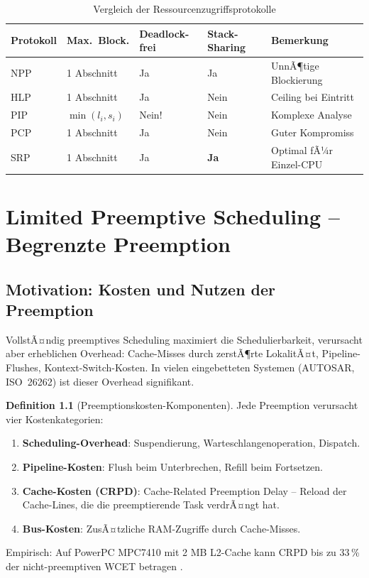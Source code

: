﻿\documentclass[a4paper,12pt]{report}
\theoremstyle{definition}
\newtheorem{definition}{Definition}[chapter]
\begin{document}
\begin{table}[H]
	\centering
	\caption{Vergleich der Ressourcenzugriffsprotokolle}
	{\small
	\begin{tabular}{p{2.0cm}p{1.9cm}p{1.9cm}p{2.0cm}p{3.0cm}}
		\toprule
		\textbf{Protokoll} & \textbf{Max.\ Block.} & \textbf{Deadlock-frei} & \textbf{Stack-Sharing} & \textbf{Bemerkung} \\
		\midrule
		NPP    & 1 Abschnitt & Ja & Ja & UnnÃ¶tige Blockierung \\
		HLP    & 1 Abschnitt & Ja & Nein & Ceiling bei Eintritt \\
		PIP    & $\min(l_i,s_i)$ & Nein! & Nein & Komplexe Analyse \\
		PCP    & 1 Abschnitt & Ja & Nein & Guter Kompromiss \\
		SRP    & 1 Abschnitt & Ja & \textbf{Ja} & Optimal fÃ¼r Einzel-CPU \\
		\bottomrule
	\end{tabular}
	}
\end{table}

\chapter{Limited Preemptive Scheduling -- Begrenzte Preemption}
\label{chap:limited}

\section{Motivation: Kosten und Nutzen der Preemption}

VollstÃ¤ndig preemptives Scheduling maximiert die Schedulierbarkeit, verursacht aber
erheblichen Overhead: Cache-Misses durch zerstÃ¶rte LokalitÃ¤t, Pipeline-Flushes,
Kontext-Switch-Kosten. In vielen eingebetteten Systemen (AUTOSAR, ISO~26262) ist
dieser Overhead signifikant.

\begin{definition}[Preemptionskosten-Komponenten]
	Jede Preemption verursacht vier Kostenkategorien:
	\begin{enumerate}
		\item \textbf{Scheduling-Overhead}: Suspendierung, Warteschlangenoperation, Dispatch.
		\item \textbf{Pipeline-Kosten}: Flush beim Unterbrechen, Refill beim Fortsetzen.
		\item \textbf{Cache-Kosten (CRPD)}: Cache-Related Preemption Delay --
		      Reload der Cache-Lines, die die preemptierende Task verdrÃ¤ngt hat.
		\item \textbf{Bus-Kosten}: ZusÃ¤tzliche RAM-Zugriffe durch Cache-Misses.
	\end{enumerate}
	Empirisch: Auf PowerPC MPC7410 mit 2 MB L2-Cache kann CRPD bis zu 33\,\%
	der nicht-preemptiven WCET betragen \cite{Buttazzo2011}.
\end{definition}
\end{document}
